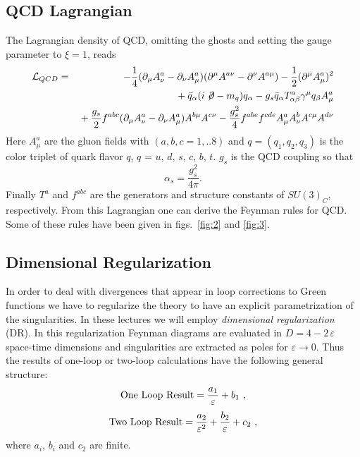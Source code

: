 \documentclass[12pt,rotate]{article}
\def\as{\alpha_s}
\newcommand{\be}{\begin{equation}}
\newcommand{\ee}{\end{equation}}
\begin{document}
\begin{itemize}
\subsection{QCD Lagrangian}
The Lagrangian density of QCD, omitting the ghosts and setting the
gauge parameter to $\xi=1$,  reads
\begin{eqnarray}\label{lqcd}
{\cal L}_{QCD} & = &
-{1\over 4}(\partial_\mu A^a_\nu-\partial_\nu A^a_\mu)
(\partial^\mu A^{a\nu}-\partial^\nu A^{a\mu})-{1\over{2}}
(\partial^\mu A^a_\mu)^2   \nonumber \\
&&{}+ \bar q_\alpha (i\not\!\partial-m_q)q_\alpha 
- g_s \bar q_\alpha T^a_{\alpha\beta}\gamma^\mu q_\beta 
A^a_\mu \nonumber \\
&&{}+{g_s\over 2}f^{abc}(\partial_\mu A^a_\nu-\partial_\nu A^a_\mu)
 A^{b\mu}A^{c\nu} - {g_s^2\over 4}f^{abe}f^{cde}A^a_\mu A^b_\nu
 A^{c\mu}A^{d\nu} 
\end{eqnarray}
Here  $A^a_\mu$ are the gluon fields with $(a,b,c=1,..8)$
 and
 $q=(q_1, q_2, q_3)$ is the color triplet of quark flavor $q$,
$q$ = $u$, $d$, $s$, $c$, $b$, $t$. 
$g_s$ is the QCD coupling so that
\be
\as=\frac{g^2_s}{4\pi}.
\ee
Finally $T^a$ and $f^{abc}$ are the generators and
structure constants of $SU(3)_C$, respectively. From this Lagrangian
one can derive the Feynman rules for QCD. Some of these rules have
been given in figs.\ \ref{fig:2} and \ref{fig:3}. 

\subsection{Dimensional Regularization}
In order to deal with divergences that appear in loop
corrections to Green functions we have to regularize the theory
to have an explicit parametrization
of the singularities. In these lectures we will employ
{\it dimensional regularization} (DR). In this regularization
 Feynman diagrams are
evaluated in $D=4-2\,\varepsilon$ space-time dimensions and singularities
are extracted as poles for $\varepsilon \to 0$. Thus the results of
 one-loop or two-loop calculations have the following general structure:
\begin{equation}
{\rm One~ Loop~ Result} = \frac{a_1}{\varepsilon}+b_1~,
\end{equation}
\begin{equation}
{\rm Two~ Loop~ Result} = \frac{a_2}{\varepsilon^2}+
 \frac{b_2}{\varepsilon}+c_2~,
\end{equation}
where $a_i$, $b_i$ and $c_2$ are finite.


\end{itemize}
\end{document}
